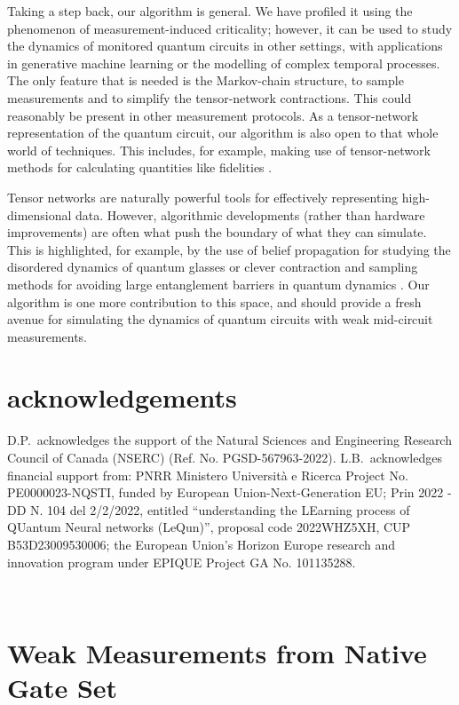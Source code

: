 \documentclass[reprint,amsmath,amssymb,aps, twocolumn, superscriptaddress, prb]{revtex4-2}
\begin{document}
Taking a step back, our algorithm is general. We have profiled it using the phenomenon of measurement-induced criticality; however, it can  be used to study the dynamics of monitored quantum circuits in other settings, with applications in generative machine learning or the modelling of complex temporal processes. The only feature that is needed is the Markov-chain structure, to sample measurements and to simplify the tensor-network contractions. This could reasonably be present in other measurement protocols. As a tensor-network representation of the quantum circuit, our algorithm is also open to that whole world of techniques. This includes, for example, making use of tensor-network methods for calculating quantities like fidelities \cite{HauruPRA2018}. 

Tensor networks are naturally powerful tools for effectively representing high-dimensional data. However, algorithmic developments (rather than hardware improvements) are often what push the boundary of what they can simulate. This is highlighted, for example, by the use of belief propagation for studying the disordered dynamics of quantum glasses \cite{TindallArxiv2025} or clever contraction and sampling methods for avoiding large entanglement barriers in quantum dynamics \cite{CarignanoArxiv2025}. Our algorithm is one more contribution to this space, and should provide a fresh avenue for simulating the dynamics of quantum circuits with weak mid-circuit measurements.

\section*{acknowledgements}
D.P.~acknowledges the support of the Natural Sciences and Engineering Research Council of Canada (NSERC) (Ref. No. PGSD-567963-2022).
L.B.~acknowledges financial support from: 
 PNRR Ministero Universit\`a e Ricerca Project No. PE0000023-NQSTI, funded by European Union-Next-Generation EU; 
 Prin 2022 - DD N. 104 del 2/2/2022, entitled ``understanding the LEarning process of QUantum Neural networks (LeQun)'', proposal code 2022WHZ5XH, CUP B53D23009530006; 
 the European Union's Horizon Europe research and innovation program under EPIQUE Project GA No. 101135288. 


\appendix

~

\section{Weak Measurements from Native Gate Set}
\label{sec:ZZGates}
\end{document}
